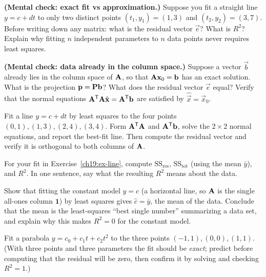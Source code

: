 \begin{exercise}\label{ch19:ex-mental-twopoints}
\textbf{(Mental check: exact fit vs approximation.)} Suppose you fit a straight line $y=c+dt$ to
only two distinct points $(t_1,y_1)=(1,3)$ and $(t_2,y_2)=(3,7)$. Before writing down any matrix:
what is the residual vector $\vec{e}$? What is $R^2$? Explain why fitting $n$ independent parameters
to $n$ data points never requires least squares.
\end{exercise}

\begin{exercise}\label{ch19:ex-mental-colspace}
\textbf{(Mental check: data already in the column space.)} Suppose a vector $\vec{b}$ already lies
in the column space of $\mathbf{A}$, so that $\mathbf{A}\mathbf{x}_0 = \mathbf{b}$ has an exact solution. What
is the projection $\mathbf{p}=\mathbf{P}\mathbf{b}$? What does the residual vector $\vec{e}$ equal? Verify
that the normal equations $\mathbf{A}^{\mathsf{T}}\mathbf{A}\hat{\mathbf{x}}=\mathbf{A}^{\mathsf{T}}\mathbf{b}$ are satisfied by
$\hat{\vec{x}}=\vec{x}_0$.
\end{exercise}

\begin{exercise}\label{ch19:ex-line}
Fit a line $y=c+dt$ by least squares to the four points $(0,1),(1,3),(2,4),(3,4)$. Form
$\mathbf{A}^{\mathsf{T}}\mathbf{A}$ and $\mathbf{A}^{\mathsf{T}}\mathbf{b}$, solve the $2\times2$ normal equations, and report the
best-fit line. Then compute the residual vector and verify it is orthogonal to both columns of
$\mathbf{A}$.
\end{exercise}

\begin{exercise}\label{ch19:ex-rsquared}
For your fit in Exercise~\ref{ch19:ex-line}, compute $\mathrm{SS_{res}}$, $\mathrm{SS_{tot}}$
(using the mean $\bar{y}$), and $R^2$. In one sentence, say what the resulting $R^2$ means about
the data.
\end{exercise}

\begin{exercise}\label{ch19:ex-horizontal}
Show that fitting the constant model $y=c$ (a horizontal line, so $\mathbf{A}$ is the single all-ones
column $\mathbf{1}$) by least squares gives $\hat{c}=\bar{y}$, the mean of the data. Conclude that
the mean is the least-squares ``best single number'' summarizing a data set, and explain why this
makes $R^2=0$ for the constant model.
\end{exercise}

\begin{exercise}\label{ch19:ex-parabola}
Fit a parabola $y=c_0+c_1 t+c_2 t^2$ to the three points $(-1,1),(0,0),(1,1)$. (With three points
and three parameters the fit should be \emph{exact}; predict before computing that the residual
will be zero, then confirm it by solving and checking $R^2=1$.)
\end{exercise}


